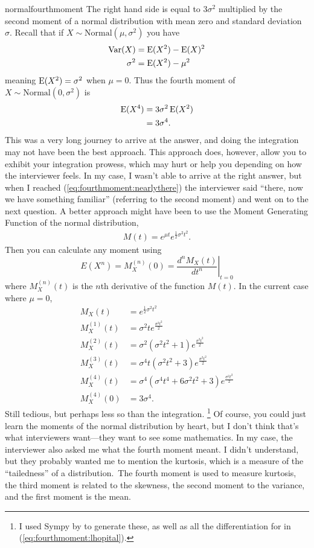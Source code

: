 \begin{answer}{normalfourthmoment}
The right hand side is equal to $3\sigma^2$ multiplied by the second moment of a normal distribution with mean zero and standard deviation $\sigma$.
Recall that if $X \sim \text{Normal}(\mu, \sigma^2)$ you have
\begin{align*}
  \operatorname{\mathrm{Var}}(X) &= \operatorname{\mathrm{E}}(X^2) - \operatorname{\mathrm{E}}(X)^2 \\
\sigma^2  &= \operatorname{\mathrm{E}}(X^2) - \mu^2
\end{align*}
meaning
$ \operatorname{\mathrm{E}}(X^2) = \sigma^2 $
when
$\mu=0$.
Thus the fourth moment of
$X \sim \text{Normal}\left(0, \sigma^2\right)$ is
\begin{align*}
\operatorname{\mathrm{E}}(X^4)
&=
3 \sigma^2 \operatorname{\mathrm{E}}(X^2)
\\&=
3 \sigma^4
\text{.}
\end{align*}
This was a very long journey to arrive at the answer, and doing the integration may not have been the best approach.
This approach does, however, allow you to exhibit your integration prowess, which may hurt or help you depending on how the interviewer feels.
In my case, I wasn't able to arrive at the right answer, but when I reached  (\ref{eq:fourthmoment:nearlythere}) the interviewer said ``there, now we have something familiar'' (referring to the second moment) and went on to the next question.
A better approach might have been to use the Moment Generating Function of the normal distribution,
\begin{align*}
  M(t) =
  e^{\mu t}
  e^{\frac{1}{2}\sigma^2 t^2}
  \text{.}
\end{align*}
Then you can calculate any moment using
\[
E \left( X^n \right) = M_X^{(n)}(0) = \left. \frac{d^n M_X (t)}{dt^n}\right|_{t=0}
\]
where $M_X^{(n)}(t)$ is the $n$th derivative of the function $M(t)$.
In the current case where $\mu=0$,
\begin{align*}
  M_X(t) &=
  e^{\frac{1}{2}\sigma^2 t^2}\\
M_X^{(1)}(t) &=
\sigma^{2} t e^{\frac{\sigma^{2} t^{2}}{2}}
\\
M_X^{(2)}(t) &=
\sigma^{2} \left(\sigma^{2} t^{2} + 1\right) e^{\frac{\sigma^{2} t^{2}}{2}}
\\
M_X^{(3)}(t) &=
\sigma^{4} t \left(\sigma^{2} t^{2} + 3\right) e^{\frac{\sigma^{2} t^{2}}{2}}
\\
M_X^{(4)}(t) &=
\sigma^{4} \left(\sigma^{4} t^{4} + 6 \sigma^{2} t^{2} + 3\right) e^{\frac{\sigma^{2} t^{2}}{2}}
\\
M_X^{(4)}(0) &=
3\sigma^{4}
\text{.}
\end{align*}
Still tedious, but perhaps less so than the integration.%
\footnote{I used Sympy by \citet{Sympy} to generate these, as well as all the differentiation for in (\ref{eq:fourthmoment:lhopital}).}
Of course, you could just learn the moments of the normal distribution by heart, but I don't think that's what interviewers want---they want to see some mathematics.
In my case, the interviewer also asked me what the fourth moment meant.
I didn't understand, but they probably wanted me to mention the kurtosis, which is a measure of the ``tailedness'' of a distribution.\
The fourth moment is used to measure kurtosis,
the third moment is related to the skewness,
the second moment to the variance, and the first moment is the mean.



\end{answer}
